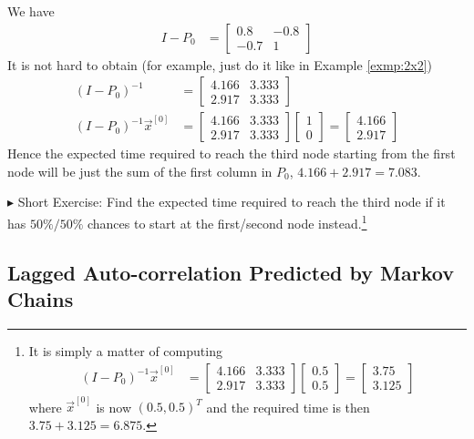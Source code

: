 \begin{solution}
We have
\begin{align*}
I - P_0 &= 
\begin{bmatrix}
0.8 & -0.8\\
-0.7 & 1 
\end{bmatrix} 
\end{align*}
It is not hard to obtain (for example, just do it like in Example \ref{exmp:2x2})
\begin{align*}
(I - P_0)^{-1} &= 
\begin{bmatrix}
4.166 & 3.333 \\
2.917 & 3.333
\end{bmatrix} \\
(I - P_0)^{-1}\vec{x}^{[0]} &= 
\begin{bmatrix}
4.166 & 3.333 \\
2.917 & 3.333
\end{bmatrix}
\begin{bmatrix}
1 \\
0
\end{bmatrix} 
=
\begin{bmatrix}
4.166 \\
2.917
\end{bmatrix}
\end{align*}
Hence the expected time required to reach the third node starting from the first node will be just the sum of the first column in $P_0$, $4.166 + 2.917 = 7.083$.
\end{solution}
$\blacktriangleright$ Short Exercise: Find the expected time required to reach the third node if it has $50\%/50\%$ chances to start at the first/second node instead.\footnote{It is simply a matter of computing
\begin{align*}
(I - P_0)^{-1}\vec{x}^{[0]} &= 
\begin{bmatrix}
4.166 & 3.333 \\
2.917 & 3.333
\end{bmatrix}
\begin{bmatrix}
0.5 \\
0.5
\end{bmatrix}=
\begin{bmatrix}
3.75 \\
3.125
\end{bmatrix}
\end{align*}
where $\vec{x}^{[0]}$ is now $(0.5, 0.5)^T$ and the required time is then $3.75 + 3.125 = 6.875$.}

\subsection{Lagged Auto-correlation Predicted by Markov Chains}

